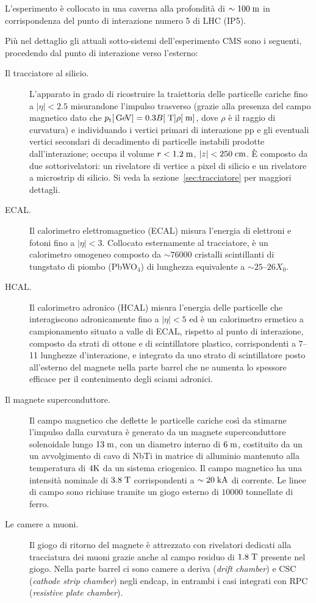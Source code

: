 L’esperimento \`e collocato in una caverna alla profondit\`a di $\sim 100 \rm \; m$ in corrispondenza del punto di interazione numero 5 di LHC (IP5). 

Pi\`u nel dettaglio gli attuali sotto-sistemi dell'esperimento CMS sono i seguenti, procedendo dal punto di interazione verso l'esterno:

\begin{description}
\item[Il tracciatore al silicio.] L'apparato in grado di ricostruire la traiettoria delle particelle cariche fino a $|\eta|<2.5$ misurandone l'impulso trasverso (grazie alla presenza del campo magnetico dato che ${p_{\rm t}} [{\rm \, Ge\kern-0.125em V}] = 0.3 B [\rm \; T] \rho [\rm \; m]$, dove $\rho$ \`e il raggio di curvatura) e individuando i vertici primari di interazione pp e gli eventuali vertici secondari di decadimento di particelle instabili prodotte dall'interazione; occupa il volume $r<1.2\rm \; m$, $|z|<250\rm \; cm$. \`E composto da due sottorivelatori: un rivelatore di vertice a pixel di silicio e un rivelatore a microstrip di silicio. Si veda la sezione~\ref{sec:tracciatore} per maggiori dettagli.
\item[ECAL.] Il calorimetro elettromagnetico (ECAL) misura l’energia di elettroni e fotoni fino a $|\eta|<3$. Collocato esternamente al tracciatore, \`e un calorimetro omogeneo composto da $\sim 76000$ cristalli scintillanti di tungstato di piombo (PbWO$_4$) di lunghezza equivalente a $\sim 25$--$26X_0$.
\item[HCAL.] Il calorimetro adronico (HCAL) misura l'energia delle particelle che interagiscono adronicamente fino a $|\eta|<5$ ed \`e un calorimetro ermetico a campionamento situato a valle di ECAL, rispetto al punto di interazione, composto da strati di ottone e di scintillatore plastico, corrispondenti a 7--11 lunghezze d'interazione, e integrato da uno strato di scintillatore posto all'esterno del magnete nella parte barrel che ne aumenta lo spessore efficace per il contenimento degli sciami adronici.
\item[Il magnete superconduttore.] Il campo magnetico che deflette le particelle cariche cos\`i da stimarne l'impulso dalla curvatura \`e generato da un magnete superconduttore solenoidale lungo $13\rm \; m$, con un diametro interno di $6\rm \; m$, costituito da un un avvolgimento di cavo di NbTi in matrice di alluminio mantenuto alla temperatura di $4{\mathrm K}$ da un sistema criogenico. Il campo magnetico ha una intensit\`a nominale di $3.8\rm \; T$ corrispondenti a $\sim 20\rm \; kA$ di corrente. Le linee di campo sono richiuse tramite un giogo esterno di $10000$ tonnellate di ferro.
\item[Le camere a muoni.] Il giogo di ritorno del magnete \`e attrezzato con rivelatori dedicati alla tracciatura dei muoni grazie anche al campo residuo di $1.8\rm \; T$ presente nel giogo. Nella parte barrel ci sono camere a deriva ({\em drift chamber}) e CSC ({\em cathode strip chamber}) negli endcap, in entrambi i casi integrati con RPC ({\em resistive plate chamber}).  
\end{description}


